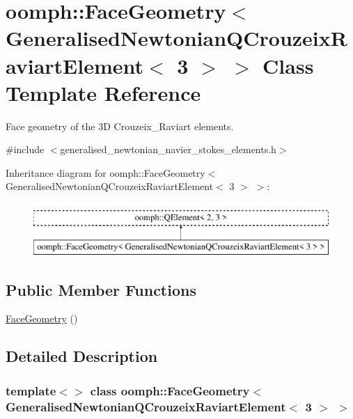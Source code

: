\hypertarget{classoomph_1_1FaceGeometry_3_01GeneralisedNewtonianQCrouzeixRaviartElement_3_013_01_4_01_4}{}\section{oomph\+:\+:Face\+Geometry$<$ Generalised\+Newtonian\+Q\+Crouzeix\+Raviart\+Element$<$ 3 $>$ $>$ Class Template Reference}
\label{classoomph_1_1FaceGeometry_3_01GeneralisedNewtonianQCrouzeixRaviartElement_3_013_01_4_01_4}


Face geometry of the 3D Crouzeix\+\_\+\+Raviart elements.  




{\ttfamily \#include $<$generalised\+\_\+newtonian\+\_\+navier\+\_\+stokes\+\_\+elements.\+h$>$}

Inheritance diagram for oomph\+:\+:Face\+Geometry$<$ Generalised\+Newtonian\+Q\+Crouzeix\+Raviart\+Element$<$ 3 $>$ $>$\+:\begin{figure}[H]
\begin{center}
\leavevmode
\includegraphics[height=2.000000cm]{classoomph_1_1FaceGeometry_3_01GeneralisedNewtonianQCrouzeixRaviartElement_3_013_01_4_01_4}
\end{center}
\end{figure}
\subsection*{Public Member Functions}
\begin{DoxyCompactItemize}
\item 
\hyperlink{classoomph_1_1FaceGeometry_3_01GeneralisedNewtonianQCrouzeixRaviartElement_3_013_01_4_01_4_a19734ae37637b47859106c3256a24323}{Face\+Geometry} ()
\end{DoxyCompactItemize}


\subsection{Detailed Description}
\subsubsection*{template$<$$>$\newline
class oomph\+::\+Face\+Geometry$<$ Generalised\+Newtonian\+Q\+Crouzeix\+Raviart\+Element$<$ 3 $>$ $>$}


